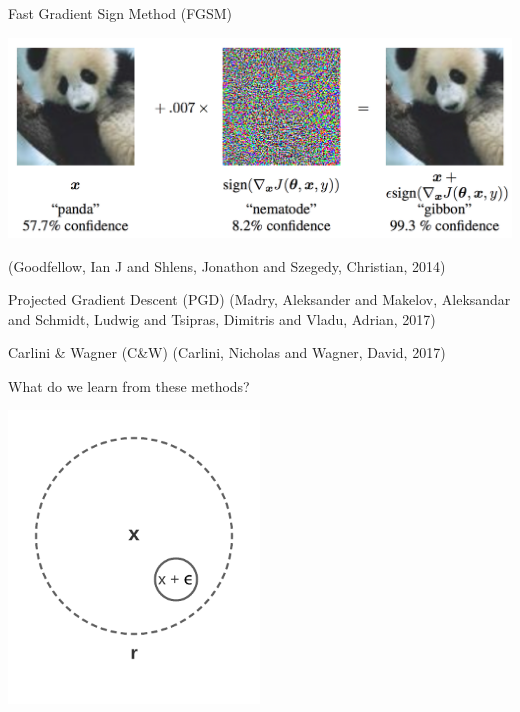 \documentclass[smaller]{beamer}
\begin{document}
\begin{frame}[label={sec:org5be9725}]{Fast Gradient Sign Method (FGSM)}
\begin{center}
\includegraphics[width=.9\linewidth]{images/fgsm_panda_image.png}
\end{center}
(Goodfellow, Ian J and Shlens, Jonathon and Szegedy, Christian, 2014)
\end{frame}

\begin{frame}[label={sec:orga1b284c}]{Projected Gradient Descent (PGD)}
(Madry, Aleksander and Makelov, Aleksandar and Schmidt, Ludwig and Tsipras, Dimitris and Vladu, Adrian, 2017)
\end{frame}

\begin{frame}[label={sec:orgfd2a6b9}]{Carlini \& Wagner (C\&W)}
(Carlini, Nicholas and Wagner, David, 2017)
\end{frame}

\begin{frame}[label={sec:orgfd008c9}]{What do we learn from these methods?}
\begin{center}
\includegraphics[width=0.5\textwidth]{images/perturbation.png}
\end{center}
\end{frame}
\end{document}
